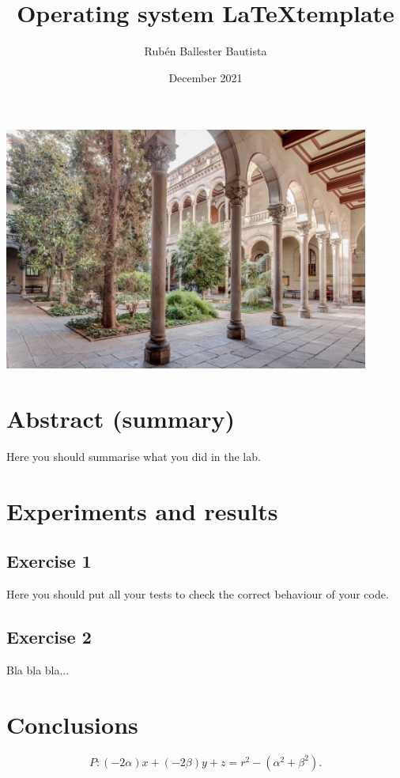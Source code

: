\documentclass{article}
\title{Operating system \LaTeX template}
\author{Rubén Ballester Bautista}
\date{December 2021}
\begin{document}
\maketitle

\begin{center}
    \includegraphics[width=0.9\textwidth]{images/example.jpg}
\end{center}

\section{Abstract (summary)}

Here you should summarise what you did in the lab.

\section{Experiments and results}
\subsection{Exercise 1}
Here you should put all your tests to check the correct behaviour of your code.
\subsection{Exercise 2}
Bla bla bla...
\section{Conclusions}

\begin{equation}
    P: (-2\alpha)x + (-2\beta)y + z = r^2 - (\alpha^2 + \beta^2).
\end{equation}
\end{document}
